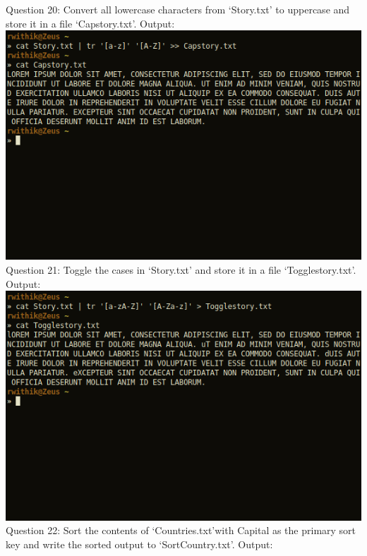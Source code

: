 \documentclass[10pt,a4paper,titlepage]{report}
\begin{document}
\newline
Question 20: Convert all lowercase characters from ‘Story.txt’ to uppercase and store it in a file ‘Capstory.txt’.\newline
Output:\newline
\includegraphics[scale=.5]{../Images/Cycle2/20.png}\pagebreak
\newline
Question 21: Toggle the cases in ‘Story.txt’ and store it in a file ‘Togglestory.txt’.\newline
Output:\newline
\includegraphics[scale=.5]{../Images/Cycle2/21.png}\newline
\newline
Question 22: Sort the contents of ‘Countries.txt’with Capital as the primary sort key and write the sorted output to ‘SortCountry.txt’.\newline
Output:\newline
\end{document}
